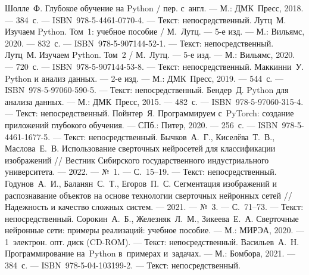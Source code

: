 \begin{thebibliography}{99}
	 Шолле~Ф. Глубокое обучение на Python / пер. с~англ. --- М.: ДМК~Пресс, 2018. --- 384~с. --- ISBN~978-5-4461-0770-4. --- Текст: непосредственный.
	 Лутц~М. Изучаем Python. Том~1: учебное пособие / М.~Лутц. --- 5-е изд. --- М.: Вильямс, 2020. --- 832~с. --- ISBN~978-5-907144-52-1. --- Текст: непосредственный.
	 Лутц~М. Изучаем Python. Том~2 / М.~Лутц. --- 5-е изд. --- М.: Вильямс, 2020. --- 720~с. --- ISBN~978-5-907144-53-8. --- Текст: непосредственный.
	 Маккинни~У. Python и анализ данных. --- 2-е изд. --- М.: ДМК~Пресс, 2019. --- 544~с. --- ISBN~978-5-97060-590-5. --- Текст: непосредственный.
	 Бендер~Д. Python для анализа данных. --- М.: ДМК~Пресс, 2015. --- 482~с. --- ISBN~978-5-97060-315-4. --- Текст: непосредственный.
	 Пойнтер~Я. Программируем с~PyTorch: создание приложений глубокого обучения. --- СПб.: Питер, 2020. --- 256~с. --- ISBN~978-5-4461-1677-5. --- Текст: непосредственный.
	 Бычков~А.~Г., Киселёва~Т.~В., Маслова~Е.~В. Использование сверточных нейросетей для классификации изображений // Вестник Сибирского государственного индустриального университета. --- 2022. --- №~1. --- С.~15--19. --- Текст: непосредственный.
	 Годунов~А.~И., Баланян~С.~Т., Егоров~П.~С. Сегментация изображений и распознавание объектов на основе технологии сверточных нейронных сетей // Надежность и качество сложных систем. --- 2021. --- №~3. --- С.~71--73. --- Текст: непосредственный.
	 Сорокин~А.~Б., Железняк~Л.~М., Зикеева~Е.~А. Сверточные нейронные сети: примеры реализаций: учебное пособие. --- М.: МИРЭА, 2020. --- 1~электрон. опт. диск (CD-ROM). --- Текст: непосредственный.
	 Васильев~А.~Н. Программирование на~Python в~примерах и~задачах. — М.: Бомбора, 2021. — 384~с. — ISBN~978-5-04-103199-2. — Текст: непосредственный.
\end{thebibliography}

